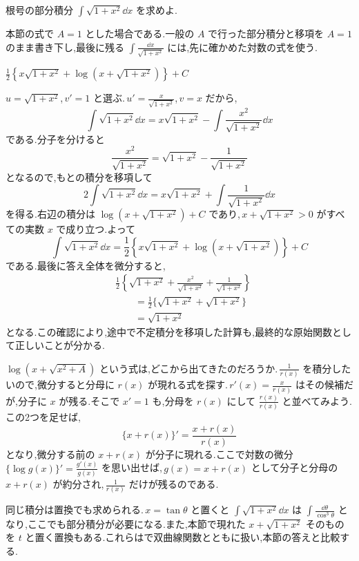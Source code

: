 \begin{example}{根号の部分積分}
$\int\sqrt{1+x^2}\dd x$ を求めよ.
\end{example}

本節の式で $A=1$ とした場合である.一般の $A$ で行った部分積分と移項を $A=1$ のまま書き下し,最後に残る $\int\frac{\dd x}{\sqrt{1+x^2}}$ には,先に確かめた対数の式を使う.

$\frac12\left\{x\sqrt{1+x^2}+\log\left(x+\sqrt{1+x^2}\right)\right\}+C$

$u=\sqrt{1+x^2}$,\,$v'=1$ と選ぶ.\,$u'=\frac{x}{\sqrt{1+x^2}}$,\,$v=x$ だから,
\[
 \int\sqrt{1+x^2}\dd x
 =x\sqrt{1+x^2}-\int\frac{x^2}{\sqrt{1+x^2}}\dd x
\]
である.分子を分けると
\[
 \frac{x^2}{\sqrt{1+x^2}}
 =\sqrt{1+x^2}-\frac1{\sqrt{1+x^2}}
\]
となるので,もとの積分を移項して
\[
 2\int\sqrt{1+x^2}\dd x
 =x\sqrt{1+x^2}+\int\frac1{\sqrt{1+x^2}}\dd x
\]
を得る.右辺の積分は $\log\left(x+\sqrt{1+x^2}\right)+C$ であり,\,$x+\sqrt{1+x^2}>0$ がすべての実数 $x$ で成り立つ.よって
\[
 \int\sqrt{1+x^2}\dd x
 =\frac12\left\{x\sqrt{1+x^2}
       +\log\left(x+\sqrt{1+x^2}\right)\right\}+C
\]
である.最後に答え全体を微分すると,
\[
\begin{aligned}
 &\frac12\left\{\sqrt{1+x^2}
       +\frac{x^2}{\sqrt{1+x^2}}
       +\frac1{\sqrt{1+x^2}}\right\}\\
 &\qquad=\frac12\{\sqrt{1+x^2}+\sqrt{1+x^2}\}\\
 &\qquad=\sqrt{1+x^2}
\end{aligned}
\]
となる.この確認により,途中で不定積分を移項した計算も,最終的な原始関数として正しいことが分かる.

$\log\left(x+\sqrt{x^2+A}\right)$ という式は,どこから出てきたのだろうか.\,$\frac1{r(x)}$ を積分したいので,微分すると分母に $r(x)$ が現れる式を探す.\,$r'(x)=\frac{x}{r(x)}$ はその候補だが,分子に $x$ が残る.そこで $x'=1$ も,分母を $r(x)$ にして $\frac{r(x)}{r(x)}$ と並べてみよう.この2つを足せば,
\[
 \{x+r(x)\}'=\frac{x+r(x)}{r(x)}
\]
となり,微分する前の $x+r(x)$ が分子に現れる.ここで対数の微分 $\{\log g(x)\}'=\frac{g'(x)}{g(x)}$ を思い出せば,\,$g(x)=x+r(x)$ として分子と分母の $x+r(x)$ が約分され,\,$\frac1{r(x)}$ だけが残るのである.

同じ積分は置換でも求められる.\,$x=\tan\theta$ と置くと $\int\sqrt{1+x^2}\dd x$ は $\int\frac{\dd\theta}{\cos^3\theta}$ となり,ここでも部分積分が必要になる.また,本節で現れた $x+\sqrt{1+x^2}$ そのものを $t$ と置く置換もある.これらはで双曲線関数とともに扱い,本節の答えと比較する.
